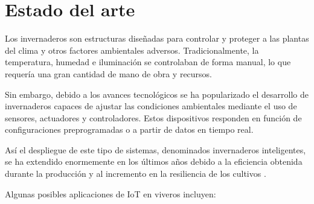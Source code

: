 



\section{Estado del arte}
\label{sec:Estado del arte}

Los invernaderos son estructuras diseñadas para controlar y proteger a las plantas del clima y otros factores ambientales adversos. Tradicionalmente, la temperatura, humedad e iluminación se controlaban de forma manual, lo que requería una gran cantidad de mano de obra y recursos. 

Sin embargo, debido a los avances tecnológicos se ha popularizado el desarrollo de invernaderos capaces de ajustar las condiciones ambientales mediante el uso de sensores, actuadores y controladores. Estos dispositivos responden en función de configuraciones preprogramadas o a partir de datos en tiempo real.  

Así el despliegue de este tipo de sistemas, denominados invernaderos inteligentes, se ha extendido enormemente en los últimos años debido a la eficiencia obtenida durante la producción y al incremento en la resiliencia de los cultivos \citep{agrofacto}. 


Algunas posibles aplicaciones de IoT en viveros incluyen:

